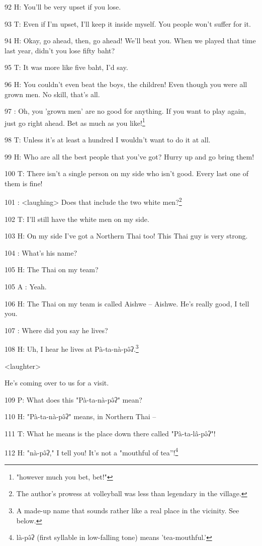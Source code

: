 92 H: You'll be very upset if you lose.

93 T: Even if I'm upset, I'll keep it inside myself. You people won't suffer for
it.

94 H: Okay, go ahead, then, go ahead! We'll beat you. When we played that time
last year, didn't you lose fifty baht?

95 T: It was more like five baht, I'd say.

96 H: You couldn't even beat the boys, the children! Even though you were all grown
men. No skill, that's all.

97 : Oh, you 'grown men' are no good for anything. If you want to play again, just
go right ahead. Bet as much as you like!\footnote{"however much you bet, bet!"}

98 T: Unless it's at least a hundred I wouldn't want to do it at all.

99 H: Who are all the best people that you've got? Hurry up and go bring them!

100 T: There isn't a single person on my side who isn't good. Every last one of
them is fine!

101 : <laughing> Does that include the two white men?\footnote{The author's prowess at volleyball was less than legendary in the village.}

102 T: I'll still have the white men on my side.

103 H: On my side I've got a Northern Thai too! This Thai guy is very strong.

104    : What's his name?

105 H: The Thai on my team?

105 A : Yeah.

106 H: The Thai on my team is called Aishwe -- Aishwe. He's really good, I tell
you.

107    : Where did you say he lives?

108 H: Uh, I hear he lives at Pà-ta-nà-pə̂ʔ.\footnote{A made-up name that sounds rather like a real place in the vicinity. See below.}

<laughter>

He's coming over to us for a visit.

109 P: What does this "Pà-ta-nà-pə̂ʔ" mean?

110 H: "Pà-ta-nà-pə̂ʔ" means, in Northern Thai --

111 T: What he means is the place down there called "Pà-ta-lâ-pə̂ʔ"!

112 H: "nà-pə̂ʔ," I tell you! It's not a "mouthful
of tea''!\footnote{là-pə̂ʔ (first syllable in low-falling tone) means 'tea-mouthful.'}

